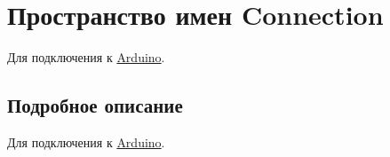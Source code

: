 \hypertarget{namespaceConnection}{}\section{Пространство имен Connection}
\label{namespaceConnection}


Для подключения к \hyperlink{namespaceArduino}{Arduino}.  




\subsection{Подробное описание}
Для подключения к \hyperlink{namespaceArduino}{Arduino}. 